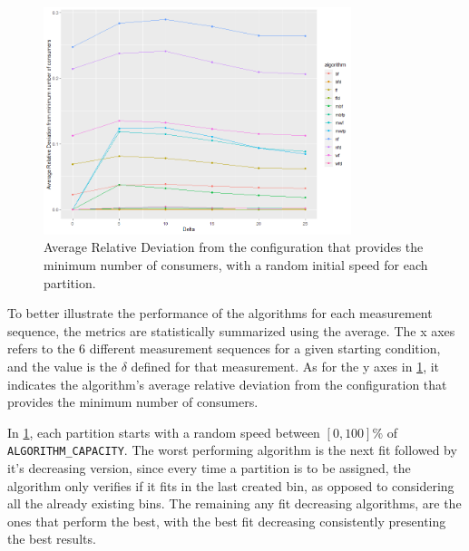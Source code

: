 \begin{figure}[H]
    \centering
    \includegraphics[width=0.8\textwidth]{images/Relative Number of Consumers.png}
\caption{Average Relative Deviation from the configuration that provides the minimum number of consumers, with a random initial speed for each partition.}
\label{fig:relative_nconsumers}
\end{figure}

To better illustrate the performance of the algorithms for each measurement sequence, the metrics are statistically summarized using the average. The x axes refers to the 6 different measurement sequences for a given starting condition, and the value is the $\delta$ defined for that measurement. As for the y axes in \ref{fig:relative_nconsumers}, it indicates the algorithm's average relative deviation from the configuration that provides the minimum number of consumers.

In \ref{fig:relative_nconsumers}, each partition starts with a random speed between $[0,100]\%$ of \lstinline[language=Python]{ALGORITHM_CAPACITY}. The worst performing algorithm is the next fit followed by it's decreasing version, since every time a partition is to be assigned, the algorithm only verifies if it fits in the last created bin, as opposed to considering all the already existing bins. The remaining any fit decreasing algorithms, are the ones that perform the best, with the best fit decreasing consistently presenting the best results. 

